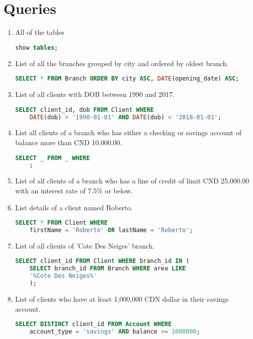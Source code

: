 \documentclass[letterpaper, 12pt]{article}
\begin{document}
\section{Queries}

\begin{enumerate}[label=(\alph*)]
  \item All of the tables
    \begin{lstlisting}[language=sql]
show tables;
  \end{lstlisting}
  \item List of all the branches grouped by city and ordered by oldest branch.
    \begin{lstlisting}[language=sql]
SELECT * FROM Branch ORDER BY city ASC, DATE(opening_date) ASC;
  \end{lstlisting}
  \item List of all clients with DOB between 1990 and 2017.
    \begin{lstlisting}[language=sql]
SELECT client_id, dob FROM Client WHERE 
	DATE(dob) > '1990-01-01' AND DATE(dob) < '2018-01-01';
  \end{lstlisting}
  \item List all clients of a branch who has either a checking or savings account of balance more than CND 10,000.00.
    \begin{lstlisting}[language=sql]
SELECT _ FROM _ WHERE 
	;
  \end{lstlisting}
  \item List of all clients of a branch who has a line of credit of limit CND 25,000.00 with an interest rate of 7.5\% or below.
  \item List details of a client named Roberto.
    \begin{lstlisting}[language=sql]
SELECT * FROM Client WHERE 
	firstName = 'Roberto' OR lastName = 'Roberto';
  \end{lstlisting}
  \item List of all clients of 'Cote Des Neiges' branch.
    \begin{lstlisting}[language=sql]
SELECT client_id FROM Client WHERE branch_id IN (
	SELECT branch_id FROM Branch WHERE area LIKE
	'%Cote Des Neiges%'
    );
  \end{lstlisting}
  \item List of clients who have at least 1,000,000 CDN dollar in their savings account.
    \begin{lstlisting}[language=sql]
SELECT DISTINCT client_id FROM Account WHERE 
	account_type = 'savings' AND balance >= 1000000;

\end{lstlisting}
\end{enumerate}
\end{document}
